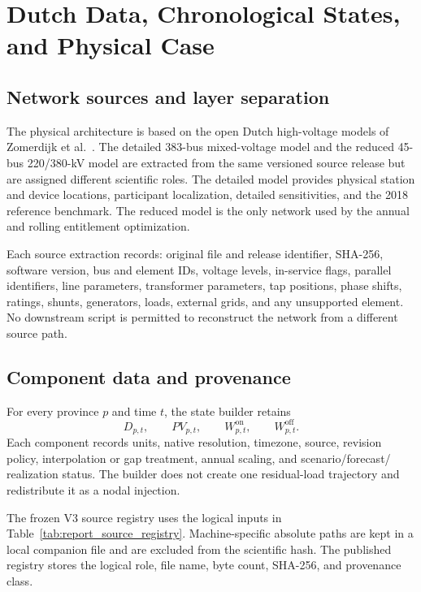 \documentclass[10pt,journal,onecolumn]{IEEEtran}
\begin{document}
\section{Dutch Data, Chronological States, and Physical Case}
\label{sec:report_dutch_data}

\subsection{Network sources and layer separation}

The physical architecture is based on the open Dutch high-voltage models of
Zomerdijk et al.\ \cite{Zomerdijk2022,ZomerdijkData}. The detailed 383-bus
mixed-voltage model and the reduced 45-bus 220/380-kV model are extracted from
the same versioned source release but are assigned different scientific roles.
The detailed model provides physical station and device locations, participant
localization, detailed sensitivities, and the 2018 reference benchmark. The
reduced model is the only network used by the annual and rolling entitlement
optimization.

Each source extraction records: original file and release identifier, SHA-256,
software version, bus and element IDs, voltage levels, in-service flags,
parallel identifiers, line parameters, transformer parameters, tap positions,
phase shifts, ratings, shunts, generators, loads, external grids, and any
unsupported element. No downstream script is permitted to reconstruct the
network from a different source path.

\subsection{Component data and provenance}

For every province $p$ and time $t$, the state builder retains
\begin{equation}
D_{p,t},\qquad PV_{p,t},\qquad W_{p,t}^{\mathrm{on}},\qquad
W_{p,t}^{\mathrm{off}}.
\end{equation}
Each component records units, native resolution, timezone, source, revision
policy, interpolation or gap treatment, annual scaling, and scenario/forecast/
realization status. The builder does not create one residual-load trajectory and
redistribute it as a nodal injection.

The frozen V3 source registry uses the logical inputs in
Table~\ref{tab:report_source_registry}. Machine-specific absolute paths are kept
in a local companion file and are excluded from the scientific hash. The
published registry stores the logical role, file name, byte count, SHA-256, and
provenance class.
\end{document}
